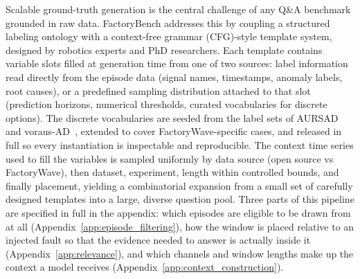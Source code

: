 Scalable ground-truth generation is the central challenge of any Q\&A benchmark grounded in raw data. FactoryBench addresses this by coupling a structured labeling ontology with a context-free grammar (CFG)-style template system, designed by robotics experts and PhD researchers. Each template contains variable slots filled at generation time from one of two sources: label information read directly from the episode data (signal names, timestamps, anomaly labels, root causes), or a predefined sampling distribution attached to that slot (prediction horizons, numerical thresholds, curated vocabularies for discrete options). The discrete vocabularies are seeded from the label sets of AURSAD~\cite{leporowski2022aursad} and voraus-AD~\cite{brockmann2023vorausad}, extended to cover FactoryWave-specific cases, and released in full so every instantiation is inspectable and reproducible. The context time series used to fill the variables is sampled uniformly by data source (open source vs FactoryWave), then dataset, experiment, length within controlled bounds, and finally placement, yielding a combinatorial expansion from a small set of carefully designed templates into a large, diverse question pool. Three parts of this pipeline are specified in full in the appendix: which episodes are eligible to be drawn from at all (Appendix~\ref{app:episode_filtering}), how the window is placed relative to an injected fault so that the evidence needed to answer is actually inside it (Appendix~\ref{app:relevance}), and which channels and window lengths make up the context a model receives (Appendix~\ref{app:context_construction}).

% 

